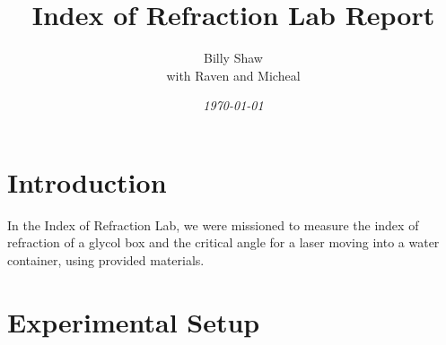 \documentclass{elegantpaper}
\title{Index of Refraction Lab Report}
\author{Billy Shaw \\ with Raven and Micheal}
\date{\small\itshape\today}
\begin{document}
\maketitle

\section{Introduction}
In the Index of Refraction Lab, we were missioned to measure the index of refraction of a glycol box and the critical angle for a laser moving into a water container, using provided materials.

\section{Experimental Setup}
\end{document}

